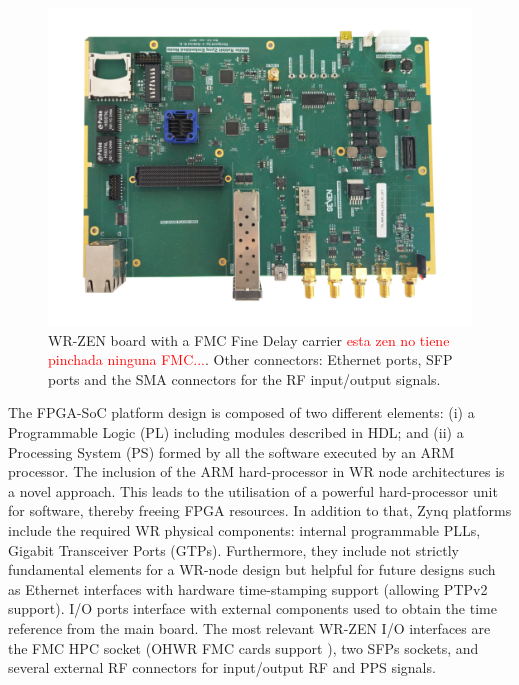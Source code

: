 \begin{figure}[H] \centering
	\includegraphics[width=0.7\linewidth]{img/wrzenv3_scaled}
	\caption[WR-ZEN board picture]{WR-ZEN board with
	a FMC Fine Delay carrier \textcolor{red}{esta zen no tiene pinchada ninguna FMC...}. Other connectors: Ethernet
	ports, SFP ports and the SMA connectors for the RF input/output
signals.} \label{fig:wrzen} \end{figure}


The FPGA-SoC platform design is composed of two different elements: (i) a
Programmable Logic (PL) including modules described in HDL; and (ii) a
Processing System (PS) formed by all the software executed by an ARM
processor.  The inclusion of the ARM hard-processor in WR node
architectures is a novel approach.  This leads to the utilisation of a powerful
hard-processor unit for software, thereby freeing FPGA resources. In addition
to that, Zynq platforms include the required WR physical components: 
internal programmable PLLs, Gigabit Transceiver Ports (GTPs).
Furthermore, they include not strictly fundamental elements for a WR-node design but helpful for
future designs such as Ethernet interfaces with hardware time-stamping support
(allowing PTPv2 support). I/O ports interface with external components used to obtain the time reference from the
main board. The most relevant WR-ZEN I/O interfaces are the FMC HPC
socket (OHWR FMC cards support
\cite{ohwr:fmc-fine-delay}), two SFPs sockets, and
several external RF connectors for input/output RF and PPS signals.

